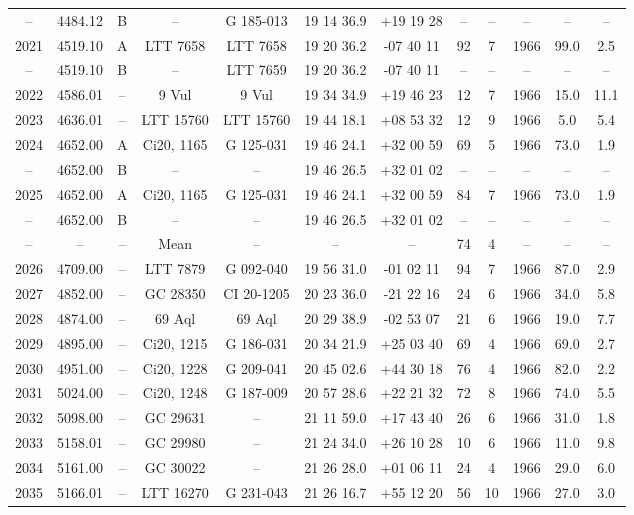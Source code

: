 \begin{table}
\begin{tabular}{cccccccccccc}
-- & 4484.12 & B & -- & G 185-013 & 19 14 36.9 & +19 19 28 & -- & -- & -- & -- & -- \\
2021 & 4519.10 & A & LTT 7658 & LTT 7658 & 19 20 36.2 & -07 40 11 & 92 & 7 & 1966 & 99.0 & 2.5 \\
-- & 4519.10 & B & -- & LTT 7659 & 19 20 36.2 & -07 40 11 & -- & -- & -- & -- & -- \\
2022 & 4586.01 & -- & 9 Vul & 9 Vul & 19 34 34.9 & +19 46 23 & 12 & 7 & 1966 & 15.0 & 11.1 \\
2023 & 4636.01 & -- & LTT 15760 & LTT 15760 & 19 44 18.1 & +08 53 32 & 12 & 9 & 1966 & 5.0 & 5.4 \\
2024 & 4652.00 & A & Ci20, 1165 & G 125-031 & 19 46 24.1 & +32 00 59 & 69 & 5 & 1966 & 73.0 & 1.9 \\
-- & 4652.00 & B & -- & -- & 19 46 26.5 & +32 01 02 & -- & -- & -- & -- & -- \\
2025 & 4652.00 & A & Ci20, 1165 & G 125-031 & 19 46 24.1 & +32 00 59 & 84 & 7 & 1966 & 73.0 & 1.9 \\
-- & 4652.00 & B & -- & -- & 19 46 26.5 & +32 01 02 & -- & -- & -- & -- & -- \\
-- & -- & -- & Mean & -- & -- & -- & 74 & 4 & -- & -- & -- \\
2026 & 4709.00 & -- & LTT 7879 & G 092-040 & 19 56 31.0 & -01 02 11 & 94 & 7 & 1966 & 87.0 & 2.9 \\
2027 & 4852.00 & -- & GC 28350 & CI 20-1205 & 20 23 36.0 & -21 22 16 & 24 & 6 & 1966 & 34.0 & 5.8 \\
2028 & 4874.00 & -- & 69 Aql & 69 Aql & 20 29 38.9 & -02 53 07 & 21 & 6 & 1966 & 19.0 & 7.7 \\
2029 & 4895.00 & -- & Ci20, 1215 & G 186-031 & 20 34 21.9 & +25 03 40 & 69 & 4 & 1966 & 69.0 & 2.7 \\
2030 & 4951.00 & -- & Ci20, 1228 & G 209-041 & 20 45 02.6 & +44 30 18 & 76 & 4 & 1966 & 82.0 & 2.2 \\
2031 & 5024.00 & -- & Ci20, 1248 & G 187-009 & 20 57 28.6 & +22 21 32 & 72 & 8 & 1966 & 74.0 & 5.5 \\
2032 & 5098.00 & -- & GC 29631 & -- & 21 11 59.0 & +17 43 40 & 26 & 6 & 1966 & 31.0 & 1.8 \\
2033 & 5158.01 & -- & GC 29980 & -- & 21 24 34.0 & +26 10 28 & 10 & 6 & 1966 & 11.0 & 9.8 \\
2034 & 5161.00 & -- & GC 30022 & -- & 21 26 28.0 & +01 06 11 & 24 & 4 & 1966 & 29.0 & 6.0 \\
2035 & 5166.01 & -- & LTT 16270 & G 231-043 & 21 26 16.7 & +55 12 20 & 56 & 10 & 1966 & 27.0 & 3.0 \\

\end{tabular}
\end{table}
